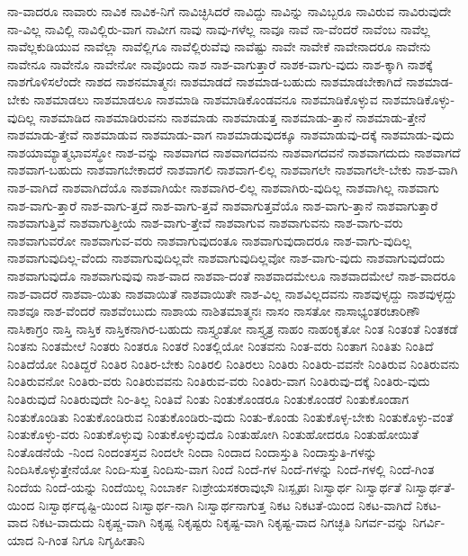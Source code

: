 {ನಾ-ವಾದರೂ
ನಾವಾರು
ನಾವಿಕ
ನಾವಿಕ-ನಿಗೆ
ನಾವಿಚ್ಛಿಸಿದರೆ
ನಾವಿದ್ದು
ನಾವಿನ್ನು
ನಾವಿಬ್ಬರೂ
ನಾವಿರುವ
ನಾವಿರುವುದೇ
ನಾ-ವಿಲ್ಲ
ನಾವಿಲ್ಲಿ
ನಾವಿಲ್ಲಿರು-ವಾಗ
ನಾವೀಗ
ನಾವು
ನಾವು-ಗಳೆಲ್ಲ
ನಾವೂ
ನಾವೆ
ನಾ-ವೆಂದರೆ
ನಾವೆಂಬ
ನಾವೆಲ್ಲ
ನಾವೆಲ್ಲಕುಡಿಯುವ
ನಾವೆಲ್ಲಾ
ನಾವೆಲ್ಲಿಗೂ
ನಾವೆಲ್ಲಿರುವೆವು
ನಾವೆಷ್ಟು
ನಾವೇ
ನಾವೇಕೆ
ನಾವೇನಾದರೂ
ನಾವೇನು
ನಾವೇನೂ
ನಾವೇನೊ
ನಾವೇನೋ
ನಾವೊಂದು
ನಾಶ
ನಾಶ-ವಾಗುತ್ತಾರೆ
ನಾಶಕ-ವಾಗು-ವುದು
ನಾಶ-ಕ್ಕಾಗಿ
ನಾಶಕ್ಕೆ
ನಾಶಗೊಳಿಸಲೆಂದೇ
ನಾಶದ
ನಾಶನಮಾತ್ಮನಃ
ನಾಶಮಾಡದೆ
ನಾಶಮಾಡ-ಬಹುದು
ನಾಶಮಾಡಬೇಕಾಗಿದೆ
ನಾಶಮಾಡ-ಬೇಕು
ನಾಶಮಾಡಲು
ನಾಶಮಾಡಲೂ
ನಾಶಮಾಡಿ
ನಾಶಮಾಡಿಕೊಂಡವನೂ
ನಾಶಮಾಡಿಕೊಳ್ಳುವ
ನಾಶಮಾಡಿಕೊಳ್ಳು-ವುದಿಲ್ಲ
ನಾಶಮಾಡಿದ
ನಾಶಮಾಡಿರುವನು
ನಾಶಮಾಡು
ನಾಶಮಾಡುತ್ತ
ನಾಶಮಾಡು-ತ್ತಾನೆ
ನಾಶಮಾಡು-ತ್ತೇನೆ
ನಾಶಮಾಡು-ತ್ತೇವೆ
ನಾಶಮಾಡುವ
ನಾಶಮಾಡು-ವಾಗ
ನಾಶಮಾಡುವುದಕ್ಕೂ
ನಾಶಮಾಡುವು-ದಕ್ಕೆ
ನಾಶಮಾಡು-ವುದು
ನಾಶಯಾಮ್ಯಾತ್ಮಭಾವಸ್ಥೋ
ನಾಶ-ವನ್ನು
ನಾಶವಾಗದ
ನಾಶವಾಗದವನು
ನಾಶವಾಗದವನೆ
ನಾಶವಾಗದುದು
ನಾಶವಾಗದೆ
ನಾಶವಾಗ-ಬಹುದು
ನಾಶವಾಗಬೇಕಾದರೆ
ನಾಶವಾಗಲಿ
ನಾಶವಾಗ-ಲಿಲ್ಲ
ನಾಶವಾಗಲೇ
ನಾಶವಾಗಲೇ-ಬೇಕು
ನಾಶ-ವಾಗಿ
ನಾಶ-ವಾಗಿದೆ
ನಾಶವಾಗಿದೆಯೊ
ನಾಶವಾಗಿಯೇ
ನಾಶವಾಗಿರ-ಲಿಲ್ಲ
ನಾಶವಾಗಿರು-ವುದಿಲ್ಲ
ನಾಶವಾಗಿಲ್ಲ
ನಾಶವಾಗು
ನಾಶ-ವಾಗು-ತ್ತಾರೆ
ನಾಶ-ವಾಗು-ತ್ತದೆ
ನಾಶ-ವಾಗು-ತ್ತವೆ
ನಾಶವಾಗುತ್ತವೆಯೊ
ನಾಶ-ವಾಗು-ತ್ತಾನೆ
ನಾಶವಾಗುತ್ತಾರೆ
ನಾಶವಾಗುತ್ತಿವೆ
ನಾಶವಾಗುತ್ತೀಯೆ
ನಾಶ-ವಾಗು-ತ್ತೇವೆ
ನಾಶವಾಗುವ
ನಾಶವಾಗುವನು
ನಾಶ-ವಾಗು-ವರು
ನಾಶವಾಗುವರೋ
ನಾಶವಾಗುವ-ವರು
ನಾಶವಾಗುವುದಂತೂ
ನಾಶವಾಗುವುದಾದರೂ
ನಾಶ-ವಾಗು-ವುದಿಲ್ಲ
ನಾಶವಾಗುವುದಿಲ್ಲ-ವೆಂದು
ನಾಶವಾಗುವುದಿಲ್ಲವೇ
ನಾಶವಾಗುವುದಿಲ್ಲವೋ
ನಾಶ-ವಾಗು-ವುದು
ನಾಶವಾಗುವುದೆಂದು
ನಾಶವಾಗುವುದೊ
ನಾಶವಾಗುವುವು
ನಾಶ-ವಾದ
ನಾಶವಾ-ದಂತೆ
ನಾಶವಾದಮೇಲೂ
ನಾಶವಾದಮೇಲೆ
ನಾಶ-ವಾದರೂ
ನಾಶ-ವಾದರೆ
ನಾಶವಾ-ಯಿತು
ನಾಶವಾಯಿತೆ
ನಾಶವಾಯಿತೇ
ನಾಶ-ವಿಲ್ಲ
ನಾಶವಿಲ್ಲದವನು
ನಾಶವುಳೃದ್ದು
ನಾಶವುಳ್ಳದ್ದು
ನಾಶವೂ
ನಾಶ-ವೆಂದರೆ
ನಾಶವೆಂಬುದು
ನಾಶಾಯ
ನಾಶಿತಮಾತ್ಮನಃ
ನಾಸಂ
ನಾಸತೋ
ನಾಸಾಭ್ಯಂತರಚಾರಿಣೌ
ನಾಸಿಕಾಗ್ರಂ
ನಾಸ್ತಿ
ನಾಸ್ತಿಕ
ನಾಸ್ತಿಕನಾಗಿರ-ಬಹುದು
ನಾಸ್ತ್ಯಂತೋ
ನಾಸ್ತ್ಯತ್ರ
ನಾಹಂ
ನಾಹಂಕೃತೋ
ನಿಂತ
ನಿಂತಂತೆ
ನಿಂತಕಡೆ
ನಿಂತನು
ನಿಂತಮೇಲೆ
ನಿಂತರು
ನಿಂತರೂ
ನಿಂತರೆ
ನಿಂತಲ್ಲಿಯೋ
ನಿಂತವನು
ನಿಂತ-ವರು
ನಿಂತಾಗ
ನಿಂತಿತು
ನಿಂತಿದೆ
ನಿಂತಿದೆಯೋ
ನಿಂತಿದ್ದರೆ
ನಿಂತಿರ
ನಿಂತಿರ-ಬೇಕು
ನಿಂತಿರಲಿ
ನಿಂತಿರಲು
ನಿಂತಿರು
ನಿಂತಿರು-ವವನೇ
ನಿಂತಿರುವ
ನಿಂತಿರುವನು
ನಿಂತಿರುವನೋ
ನಿಂತಿರು-ವರು
ನಿಂತಿರುವವನು
ನಿಂತಿರುವ-ವರು
ನಿಂತಿರು-ವಾಗ
ನಿಂತಿರುವು-ದಕ್ಕೆ
ನಿಂತಿರು-ವುದು
ನಿಂತಿರುವುದೆ
ನಿಂತಿರುವುದೇ
ನಿಂ-ತಿಲ್ಲ
ನಿಂತಿವೆ
ನಿಂತು
ನಿಂತುಕೊಂಡರೂ
ನಿಂತುಕೊಂಡರೆ
ನಿಂತುಕೊಂಡಾಗ
ನಿಂತುಕೊಂಡಿತು
ನಿಂತುಕೊಂಡಿರುವ
ನಿಂತುಕೊಂಡಿರು-ವುದು
ನಿಂತು-ಕೊಂಡು
ನಿಂತುಕೊಳ್ಳ-ಬೇಕು
ನಿಂತುಕೊಳ್ಳು-ವಂತೆ
ನಿಂತುಕೊಳ್ಳು-ವರು
ನಿಂತುಕೊಳ್ಳುವು
ನಿಂತುಕೊಳ್ಳುವುದೊ
ನಿಂತುಹೋಗಿ
ನಿಂತುಹೋದರೂ
ನಿಂತುಹೋಯಿತೆ
ನಿಂತೊಡನೆಯೆ
-ನಿಂದ
ನಿಂದಂತಸ್ತವ
ನಿಂದಲೇ
ನಿಂದಾ
ನಿಂದಾದ
ನಿಂದಾಸ್ತುತಿ
ನಿಂದಾಸ್ತುತಿ-ಗಳನ್ನು
ನಿಂದಿಸಿಕೊಳ್ಳುತ್ತೇನೆಯೋ
ನಿಂದಿ-ಸುತ್ತ
ನಿಂದಿಸು-ವಾಗ
ನಿಂದೆ
ನಿಂದೆ-ಗಳ
ನಿಂದೆ-ಗಳನ್ನು
ನಿಂದೆ-ಗಳಲ್ಲಿ
ನಿಂದೆ-ಗಿಂತ
ನಿಂದೆಯ
ನಿಂದೆ-ಯನ್ನು
ನಿಂದೆಯಿಲ್ಲ
ನಿಂಬಾರ್ಕ
ನಿಃಶ್ರೇಯಸಕರಾವುಭೌ
ನಿಃಸ್ಪೃಹಃ
ನಿಃಸ್ವಾರ್ಥ
ನಿಃಸ್ವಾರ್ಥತೆ
ನಿಃಸ್ವಾರ್ಥತೆ-ಯಿಂದ
ನಿಃಸ್ವಾರ್ಥದೃಷ್ಟಿ-ಯಿಂದ
ನಿಃಸ್ವಾರ್ಥ-ನಾಗಿ
ನಿಃಸ್ವಾರ್ಥನಾಗುತ್ತ
ನಿಕಟ
ನಿಕಟತೆ-ಯಿಂದ
ನಿಕಟ-ವಾಗಿದೆ
ನಿಕಟ-ವಾದ
ನಿಕಟ-ವಾದುದು
ನಿಕೃಷ್ಚ-ವಾಗಿ
ನಿಕೃಷ್ಟ
ನಿಕೃಷ್ಟರು
ನಿಕೃಷ್ಟ-ವಾಗಿ
ನಿಕೃಷ್ಟ-ವಾದ
ನಿಗಚ್ಛತಿ
ನಿಗರ್ವ-ವನ್ನು
ನಿಗರ್ವಿ-ಯಾದ
ನಿ-ಗಿಂತ
ನಿಗೂ
ನಿಗೃಹೀತಾನಿ
}
